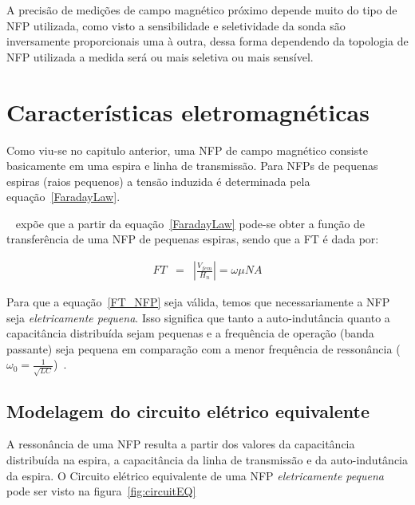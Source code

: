 A precisão de medições de campo magnético próximo depende muito do tipo de NFP utilizada, como visto a sensibilidade e seletividade da sonda são inversamente proporcionais uma à outra, dessa forma dependendo da topologia de NFP utilizada a medida será ou mais seletiva ou mais sensível. 

\section{Características eletromagnéticas}
Como viu-se no capitulo anterior, uma NFP de campo magnético consiste basicamente em uma espira e linha de transmissão. Para NFPs de pequenas espiras (raios pequenos) a tensão induzida é determinada pela equação~\ref{FaradayLaw}. 

~ expõe que a partir da equação~\ref{FaradayLaw} pode-se obter a função de transferência de uma NFP de pequenas espiras, sendo que a FT é dada por:

\begin{eqnarray}
FT &=& \left | \frac{V_{fem}}{H_n} \right | = \omega \mu NA    \label{FT_NFP}
\end{eqnarray}

Para que a equação~\ref{FT_NFP} seja válida, temos que necessariamente a NFP seja \textit{eletricamente pequena}. Isso significa que tanto a auto-indutância quanto a capacitância distribuída sejam pequenas e a frequência de operação (banda passante) seja pequena em comparação com a menor frequência de ressonância ($\omega_0 = \frac{1}{\sqrt{LC}}$)~\cite[p.~1357]{kanda1993}.

\subsection{Modelagem do circuito elétrico equivalente}
A ressonância de uma NFP resulta a partir dos valores da capacitância distribuída na espira, a capacitância da linha de transmissão e da auto-indutância da espira. O Circuito elétrico equivalente de uma NFP \textit{eletricamente pequena} pode ser visto na figura~\ref{fig:circuitEQ} 

